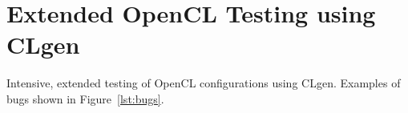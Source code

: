 \section{Extended OpenCL Testing using CLgen}

Intensive, extended testing of OpenCL configurations using CLgen. Examples of bugs shown in Figure~\ref{lst:bugs}.


